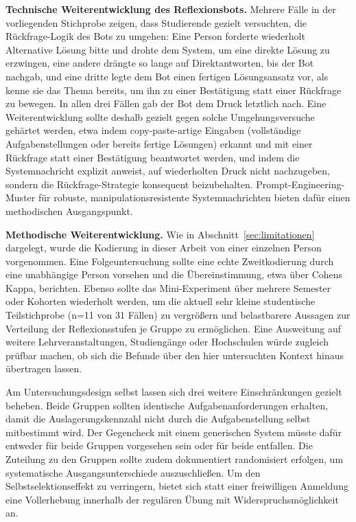 \textbf{Technische Weiterentwicklung des Reflexionsbots.} Mehrere Fälle in der vorliegenden
Stichprobe zeigen, dass Studierende gezielt versuchten, die Rückfrage-Logik des Bots zu umgehen: Eine
Person forderte wiederholt \glqq Alternative Lösung bitte\grqq{} und drohte dem System, um eine
direkte Lösung zu erzwingen, eine andere drängte so lange auf Direktantworten, bis der Bot nachgab,
und eine dritte legte dem Bot einen fertigen Lösungsansatz vor, als kenne sie das Thema bereits, um
ihn zu einer Bestätigung statt einer Rückfrage zu bewegen. In allen drei Fällen gab der Bot dem Druck
letztlich nach. Eine Weiterentwicklung sollte deshalb gezielt gegen solche Umgehungsversuche
gehärtet werden, etwa indem copy-paste-artige Eingaben (vollständige Aufgabenstellungen oder bereits
fertige Lösungen) erkannt und mit einer Rückfrage statt einer Bestätigung beantwortet werden, und
indem die Systemnachricht explizit anweist, auf wiederholten Druck nicht nachzugeben, sondern die
Rückfrage-Strategie konsequent beizubehalten. Prompt-Engineering-Muster für robuste,
manipulationsresistente Systemnachrichten \cite{whitePromptPatternCatalog2023} bieten dafür einen
methodischen Ausgangspunkt.

\textbf{Methodische Weiterentwicklung.} Wie in Abschnitt~\ref{sec:limitationen} dargelegt, wurde die
Kodierung in dieser Arbeit von einer einzelnen Person vorgenommen. Eine Folgeuntersuchung sollte eine
echte Zweitkodierung durch eine unabhängige Person vorsehen und die Übereinstimmung, etwa über Cohens
Kappa, berichten. Ebenso sollte das Mini-Experiment über mehrere Semester oder Kohorten wiederholt
werden, um die aktuell sehr kleine studentische Teilstichprobe (n=11 von 31 Fällen) zu vergrößern und
belastbarere Aussagen zur Verteilung der Reflexionsstufen je Gruppe zu ermöglichen. Eine Ausweitung
auf weitere Lehrveranstaltungen, Studiengänge oder Hochschulen würde zugleich prüfbar machen, ob sich
die Befunde über den hier untersuchten Kontext hinaus übertragen lassen.

Am Untersuchungsdesign selbst lassen sich drei weitere Einschränkungen gezielt beheben. Beide Gruppen
sollten identische Aufgabenanforderungen erhalten, damit die Auslagerungskennzahl nicht durch die
Aufgabenstellung selbst mitbestimmt wird. Der Gegencheck mit einem generischen System müsste dafür
entweder für beide Gruppen vorgesehen sein oder für beide entfallen. Die Zuteilung zu den Gruppen
sollte zudem dokumentiert randomisiert erfolgen, um systematische Ausgangsunterschiede auszuschließen.
Um den Selbstselektionseffekt zu verringern, bietet sich statt einer freiwilligen Anmeldung eine
Vollerhebung innerhalb der regulären Übung mit Widerspruchsmöglichkeit an.

